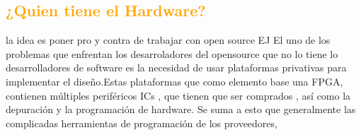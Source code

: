 \documentclass[a4paper,11pt]{article}
\begin{document}
		\subsection{\textcolor{orange}{¿Quien tiene el Hardware?}} 

la idea es poner pro y contra de trabajar con open source
EJ
El uno de los problemas que enfrentan los desarroladores del opensource que no lo tiene lo desarrolladores  de software es la necesidad de usar plataformas privativas para implementar el diseño.Estas plataformas que como elemento base una FPGA, contienen múltiples periféricos ICs , que tienen que ser comprados , así como la depuración y la programación de hardware.
Se suma a esto que generalmente las complicadas herramientas de programación de los proveedores, 
\end{document}
